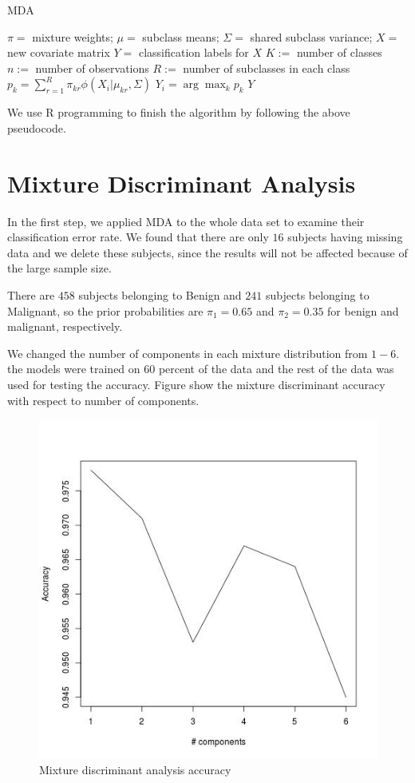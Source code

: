 \documentclass[12pt]{article}
\def\newpage{\vfill\eject}
\begin{document}
\begin{algorithm}
	\caption{MDA}
	\label{alg:2}
	\begin{algorithmic}
		\REQUIRE $\pi =$ mixture weights; $\mu =$ subclass means; $\Sigma =$ shared subclass variance; $X =$ new covariate matrix
		\ENSURE $Y =$ classification labels for $X$
		\STATE $K :=$ number of classes
		\STATE $n :=$ number of observations
		\STATE $R :=$ number of subclasses in each class
		\STATE $p_k = \sum_{r=1}^R \pi_{kr} \phi(X_i|\mu_{kr},\Sigma)$
		\ENDFOR
		\STATE $Y_i = \arg\max_k p_k$
		\ENDFOR
		\RETURN $Y$
	\end{algorithmic}
\end{algorithm}
We use R programming to finish the algorithm by following the above pseudocode.

\newpage
\section{Mixture Discriminant Analysis}
In the first step, we applied MDA to the whole data set to examine their classification error rate. We found that there are only $16$ subjects having missing data and we delete these subjects, since the results will not be affected because of the large sample size.

There are $458$ subjects belonging to Benign and $241$ subjects belonging to Malignant, so the prior probabilities are $\pi_1=0.65$ and $\pi_2=0.35$ for benign and malignant, respectively.

We changed the number of components in each mixture distribution from $1-6$. the models were trained on 60 percent of the data and the rest of the data was used for testing the accuracy. Figure \cite{mda_acc} show the mixture discriminant accuracy with respect to number of components.

\begin{figure}
\includegraphics[scale=.8]{mda_acc.jpeg}
\caption{Mixture discriminant analysis accuracy}
\label{mda_acc}
\end{figure}
\end{document}
